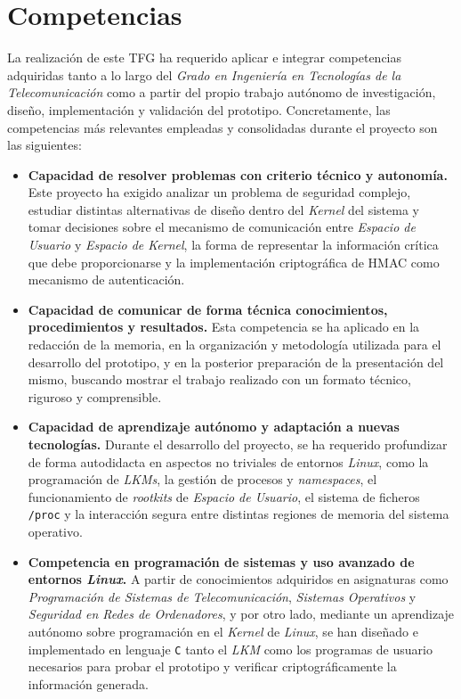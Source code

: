 \section{Competencias}

La realización de este TFG ha requerido aplicar e integrar competencias adquiridas tanto a lo largo del \textit{Grado en Ingeniería en Tecnologías de la Telecomunicación} como a partir del propio trabajo autónomo de investigación, diseño, implementación y validación del prototipo.
Concretamente, las competencias más relevantes empleadas y consolidadas durante el proyecto son las siguientes:

\begin{itemize}
    \item \textbf{Capacidad de resolver problemas con criterio técnico y autonomía.} Este proyecto ha exigido analizar un problema de seguridad complejo, estudiar distintas alternativas de diseño dentro del \textit{Kernel} del sistema y tomar decisiones sobre el mecanismo de comunicación entre \textit{Espacio de Usuario} y \textit{Espacio de Kernel}, la forma de representar la información crítica que debe proporcionarse y la implementación criptográfica de HMAC como mecanismo de autenticación.
    
    \item \textbf{Capacidad de comunicar de forma técnica conocimientos, procedimientos y resultados.} Esta competencia se ha aplicado en la redacción de la memoria, en la organización y metodología utilizada para el desarrollo del prototipo, y en la posterior preparación de la presentación del mismo, buscando mostrar el trabajo realizado con un formato técnico, riguroso y comprensible.
    
    \item \textbf{Capacidad de aprendizaje autónomo y adaptación a nuevas tecnologías.} Durante el desarrollo del proyecto, se ha requerido profundizar de forma autodidacta en aspectos no triviales de entornos \textit{Linux}, como la programación de \textit{LKMs}, la gestión de procesos y \textit{namespaces}, el funcionamiento de \textit{rootkits} de \textit{Espacio de Usuario}, el sistema de ficheros \texttt{/proc} y la interacción segura entre distintas regiones de memoria del sistema operativo.
    
    \item \textbf{Competencia en programación de sistemas y uso avanzado de entornos \textit{Linux}.} A partir de conocimientos adquiridos en asignaturas como \textit{Programación de Sistemas de Telecomunicación}, \textit{Sistemas Operativos} y \textit{Seguridad en Redes de Ordenadores}, y por otro lado, mediante un aprendizaje autónomo sobre programación en el \textit{Kernel} de \textit{Linux}, se han diseñado e implementado en lenguaje \texttt{C} tanto el \textit{LKM} como los programas de usuario necesarios para probar el prototipo y verificar criptográficamente la información generada.
    

\end{itemize}
